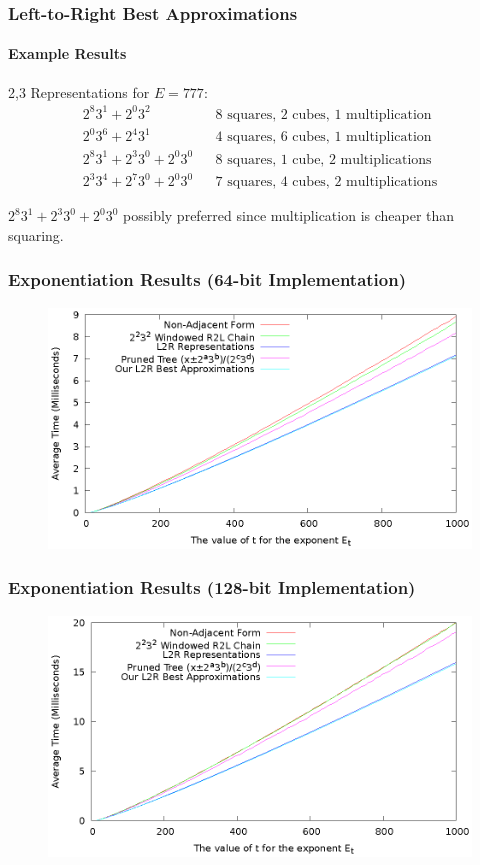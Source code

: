 \documentclass{beamer}
\begin{document}
\begin{frame}
\frametitle{Left-to-Right Best Approximations}
\framesubtitle{Example Results}
2,3 Representations for $E=777$:
\begin{align*}
2^8 3^1 + 2^0 3^2 && \textrm{8 squares, 2 cubes, 1 multiplication} \\
2^0 3^6 + 2^4 3^1 && \textrm{4 squares, 6 cubes, 1 multiplication} \\
2^8 3^1 + 2^3 3^0 + 2^0 3^0 && \textrm{8 squares, 1 cube, 2 multiplications} \\
2^3 3^4 + 2^7 3^0 + 2^0 3^0 && \textrm{7 squares, 4 cubes, 2 multiplications}
\end{align*}

\bigskip
$2^8 3^1 + 2^3 3^0 + 2^0 3^0$ possibly preferred since multiplication is cheaper than squaring.
\end{frame}




\begin{frame}
\frametitle{Exponentiation Results (64-bit Implementation)}
\begin{figure}
\includegraphics[scale=0.86]{pow-winners-64}
\end{figure}
\end{frame}
\begin{frame}
\frametitle{Exponentiation Results (128-bit Implementation)}
\begin{figure}
\includegraphics[scale=0.86]{pow-winners-128}
\end{figure}
\end{frame}
\end{document}
